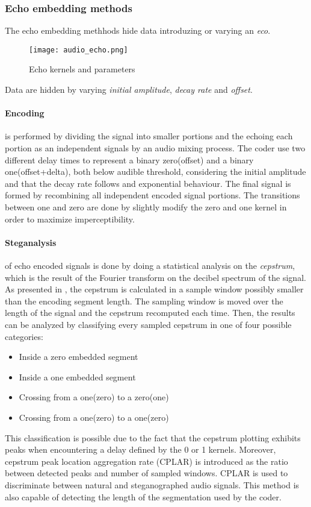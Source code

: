 \documentclass[../../main.tex]{subfiles}
\begin{document}
    \subsubsection{Echo embedding methods}
    The echo embedding methhods hide data introduzing or varying an \emph{eco}.
    \begin{figure}[h]
        \centering
        \caption{Echo kernels and parameters}
        \texttt{[image: audio\_echo.png]}
    \end{figure}
    Data are hidden by varying \emph{initial amplitude}, \emph{decay rate} and
    \emph{offset}.
    \paragraph{Encoding} is performed by dividing the signal into smaller
    portions and the echoing each portion as an independent signals by an audio
    mixing process.
    The coder use two different delay times to represent a binary zero(offset)
    and a binary one(offset+delta), both below audible threshold, considering
    the initial amplitude and that the decay rate follows and exponential
    behaviour.
    The final signal is formed by recombining all independent encoded signal
    portions.
    The transitions between one and zero are done by slightly modify the zero
    and one kernel in order to maximize imperceptibility.
    \paragraph{Steganalysis} of echo encoded signals is done by doing a
    statistical analysis on the \emph{cepstrum}, which is the result of the
    Fourier transform on the decibel spectrum of the signal.
    As presented in \cite{review-audio-steganalysis}, the cepstrum is calculated
    in a sample window possibly smaller than the encoding segment length.
    The sampling window is moved over the length of the signal and the cepstrum
    recomputed each time.
    Then, the results can be analyzed by classifying every sampled cepstrum in
    one of four possible categories:
    \begin{itemize}
        \item Inside a zero embedded segment
        \item Inside a one embedded segment
        \item Crossing from a one(zero) to a zero(one)
        \item Crossing from a one(zero) to a one(zero)
    \end{itemize}
    This classification is possible due to the fact that the cepstrum plotting
    exhibits peaks when encountering a delay defined by the 0 or 1 kernels.
    Moreover, cepstrum peak location aggregation rate (CPLAR) is introduced as
    the ratio between detected peaks and number of sampled windows.
    CPLAR is used to discriminate between natural and steganographed audio
    signals.
    This method is also capable of detecting the length of the segmentation
    used by the coder.
\end{document}
